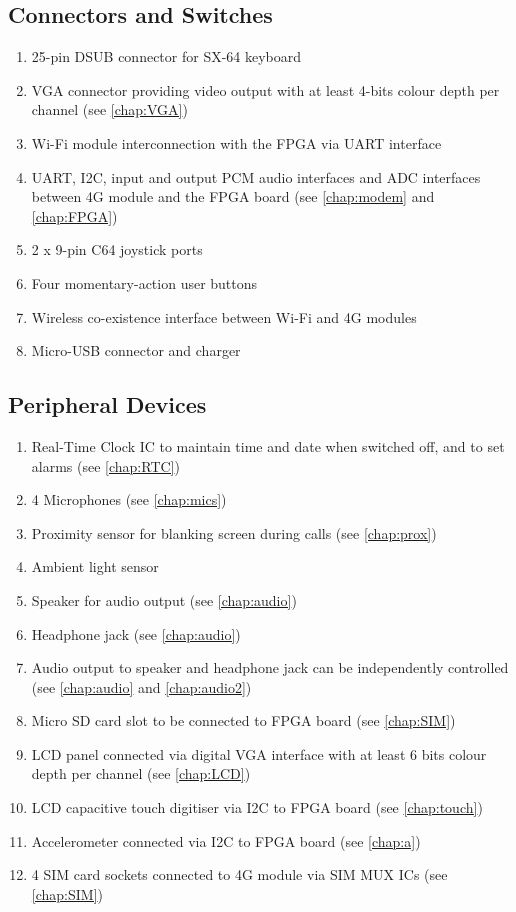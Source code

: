 \subsection{Connectors and Switches}
\begin{enumerate}
\item 25-pin DSUB connector for SX-64 keyboard 
\item VGA connector providing video output with at least 4-bits colour depth per channel (see \autoref{chap:VGA})
\item Wi-Fi module interconnection with the FPGA via UART interface
\item UART, I2C, input and output PCM audio interfaces and ADC interfaces between 4G module and the FPGA board (see \autoref{chap:modem} and \autoref{chap:FPGA})
\item 2 x 9-pin C64 joystick ports
\item Four momentary-action user buttons 
\item Wireless co-existence interface between Wi-Fi and 4G modules 
\item Micro-USB connector and charger
\end{enumerate}

\subsection{Peripheral Devices}
\begin{enumerate}
\item Real-Time Clock IC to maintain time and date when switched off, and to set alarms (see \autoref{chap:RTC})
\item 4 Microphones (see \autoref{chap:mics})
\item Proximity sensor for blanking screen during calls (see \autoref{chap:prox})
\item Ambient light sensor 
\item Speaker for audio output (see \autoref{chap:audio})
\item Headphone jack (see \autoref{chap:audio})
\item Audio output to speaker and headphone jack can be independently controlled (see \autoref{chap:audio} and \autoref{chap:audio2})
\item Micro SD card slot to be connected to FPGA board (see \autoref{chap:SIM})
\item LCD panel connected via digital VGA interface with at least 6 bits colour depth per channel (see \autoref{chap:LCD})
\item LCD capacitive touch digitiser via I2C to FPGA board (see \autoref{chap:touch})
\item Accelerometer connected via I2C to FPGA board (see \autoref{chap:a})
\item 4 SIM card sockets connected to 4G module via SIM MUX ICs (see \autoref{chap:SIM})
\end{enumerate}




